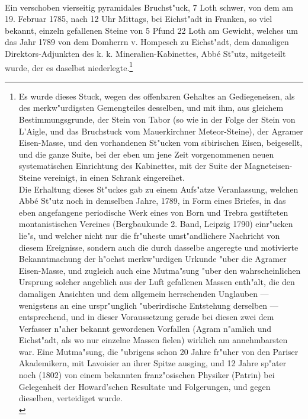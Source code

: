 \documentclass[a4paper, 11pt, oneside, german]{article}
\begin{document}
\paragraph{}
Ein verschoben vierseitig pyramidales Bruchst"uck, 7 Loth schwer, von dem am 19. Februar 1785, nach 12 Uhr Mittags, bei Eichst"adt in Franken, so viel bekannt, einzeln gefallenen Steine von 5 Pfund 22 Loth am Gewicht, welches um das Jahr 1789 von dem Domherrn v. Hompesch zu Eichst"adt, dem damaligen Direktors-Adjunkten des k. k. Mineralien-Kabinettes, Abbé St"utz, mitgeteilt wurde, der es daselbst niederlegte.\footnote{Es wurde dieses Stuck, wegen des offenbaren Gehaltes an Gediegeneisen, als des merkw"urdigsten Gemengteiles desselben, und mit ihm, aus gleichem Bestimmungsgrunde, der Stein von Tabor (so wie in der Folge der Stein von L'Aigle, und das Bruchstuck vom Mauerkirchner Meteor-Steine), der Agramer Eisen-Masse, und den vorhandenen St"ucken vom sibirischen Eisen, beigesellt, und die ganze Suite, bei der eben um jene Zeit vorgenommenen neuen systematischen Einrichtung des Kabinettes, mit der Suite der Magneteisen-Steine vereinigt, in einen Schrank eingereihet.\\
\hspace*{6mm}Die Erhaltung dieses St"uckes gab zu einem Aufs"atze Veranlassung, welchen Abbé St"utz noch in demselben Jahre, 1789, in Form eines Briefes, in das eben angefangene periodische Werk eines von Born und Trebra gestifteten montanistischen Vereines (Bergbaukunde 2. Band, Leipzig 1790) einr"ucken lie"s, und welcher nicht nur die fr"uheste umst"andlichere Nachricht von diesem Ereignisse, sondern auch die durch dasselbe angeregte und motivierte Bekanntmachung der h"ochst merkw"urdigen Urkunde "uber die Agramer Eisen-Masse, und zugleich auch eine Mutma"sung "uber den wahrscheinlichen Ursprung solcher angeblich aus der Luft gefallenen Massen enth"alt, die den damaligen Ansichten und dem allgemein herrschenden Unglauben --- wenigstens an eine urspr"unglich "uberirdische Entstehung derselben --- entsprechend, und in dieser Voraussetzung gerade bei diesen zwei dem Verfasser n"aher bekannt gewordenen Vorfallen (Agram n"amlich und Eichst"adt, als wo nur einzelne Massen fielen) wirklich am annehmbarsten war. Eine Mutma"sung, die "ubrigens schon 20 Jahre fr"uher von den Pariser Akademikern, mit Lavoisier an ihrer Spitze ausging, und 12 Jahre sp"ater noch (1802) von einem bekannten franz"osischen Physiker (Patrin) bei Gelegenheit der Howard'schen Resultate und Folgerungen, und gegen dieselben, verteidiget wurde.\\
}
\end{document}

